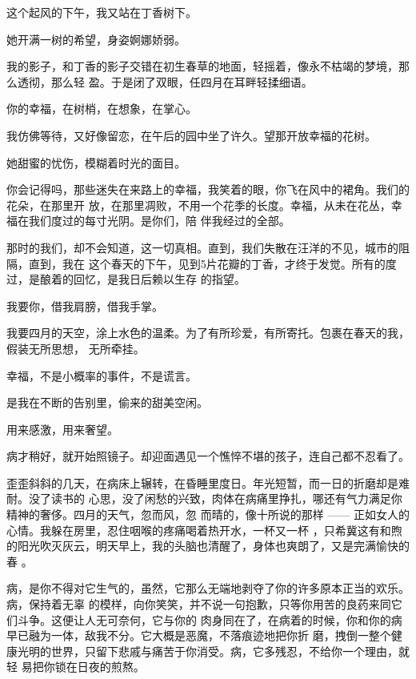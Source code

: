 \documentclass[12pt,a4paper]{article}
\begin{document}
		这个起风的下午，我又站在丁香树下。

		她开满一树的希望，身姿婀娜娇弱。

		我的影子，和丁香的影子交错在初生春草的地面，轻摇着，像永不枯竭的梦境，那么透彻，那么轻
	盈。于是闭了双眼，任四月在耳畔轻揉细语。

		你的幸福，在树梢，在想象，在掌心。


		我仿佛等待，又好像留恋，在午后的园中坐了许久。望那开放幸福的花树。

		她甜蜜的忧伤，模糊着时光的面目。

		你会记得吗，那些迷失在来路上的幸福，我笑着的眼，你飞在风中的裙角。我们的花朵，在那里开
	放，在那里凋败，不用一个花季的长度。幸福，从未在花丛，幸福在我们度过的每寸光阴。是你们，陪
	伴我经过的全部。


		那时的我们，却不会知道，这一切真相。直到，我们失散在汪洋的不见，城市的阻隔，直到，我在
	这个春天的下午，见到5片花瓣的丁香，才终于发觉。所有的度过，是酿着的回忆，是我日后赖以生存
	的指望。


		我要你，借我肩膀，借我手掌。

		我要四月的天空，涂上水色的温柔。为了有所珍爱，有所寄托。包裹在春天的我，假装无所思想，
	无所牵挂。

		幸福，不是小概率的事件，不是谎言。

		是我在不断的告别里，偷来的甜美空闲。

		用来感激，用来奢望。

	\endwriting



		病才稍好，就开始照镜子。却迎面遇见一个憔悴不堪的孩子，连自己都不忍看了。

		歪歪斜斜的几天，在病床上辗转，在昏睡里度日。年光短暂，而一日的折磨却是难耐。没了读书的
	心思，没了闲愁的兴致，肉体在病痛里挣扎，哪还有气力满足你精神的奢侈。四月的天气，忽而风，忽
	而晴的，像十所说的那样 —— 正如女人的心情。我躲在房里，忍住咽喉的疼痛喝着热开水，一杯又一杯
	，只希冀这有和煦的阳光吹灭灰云，明天早上，我的头脑也清醒了，身体也爽朗了，又是完满愉快的春
	。

		病，是你不得对它生气的，虽然，它那么无端地剥夺了你的许多原本正当的欢乐。病，保持着无辜
	的模样，向你笑笑，并不说一句抱歉，只等你用苦的良药来同它们斗争。这便让人无可奈何，它与你的
	肉身同在了，在病着的时候，你和你的病早已融为一体，敌我不分。它大概是恶魔，不落痕迹地把你折
	磨，拽倒一整个健康光明的世界，只留下悲戚与痛苦于你消受。病，它多残忍，不给你一个理由，就轻
	易把你锁在日夜的煎熬。
\end{document}
